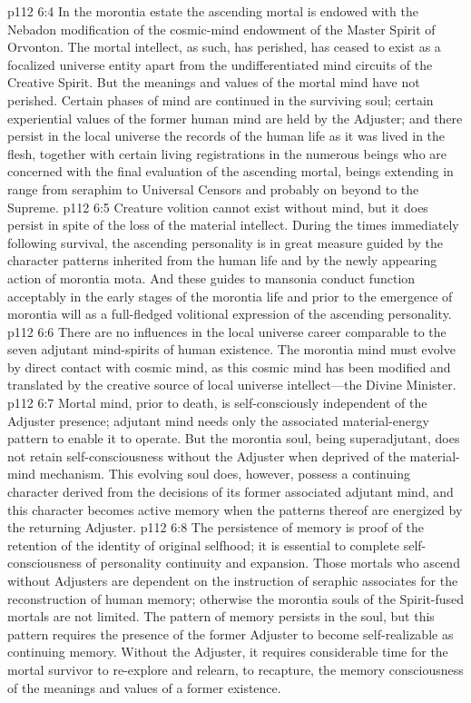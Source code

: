 \pc \vs p112 6:4 In the morontia estate the ascending mortal is endowed with the Nebadon modification of the cosmic\hyp{}mind endowment of the Master Spirit of Orvonton. The mortal intellect, as such, has perished, has ceased to exist as a focalized universe entity apart from the undifferentiated mind circuits of the Creative Spirit. But the meanings and values of the mortal mind have not perished. Certain phases of mind are continued in the surviving soul; certain experiential values of the former human mind are held by the Adjuster; and there persist in the local universe the records of the human life as it was lived in the flesh, together with certain living registrations in the numerous beings who are concerned with the final evaluation of the ascending mortal, beings extending in range from seraphim to Universal Censors and probably on beyond to the Supreme.
\vs p112 6:5 Creature volition cannot exist without mind, but it does persist in spite of the loss of the material intellect. During the times immediately following survival, the ascending personality is in great measure guided by the character patterns inherited from the human life and by the newly appearing action of morontia mota. And these guides to mansonia conduct function acceptably in the early stages of the morontia life and prior to the emergence of morontia will as a full\hyp{}fledged volitional expression of the ascending personality.
\vs p112 6:6 There are no influences in the local universe career comparable to the seven adjutant mind\hyp{}spirits of human existence. The morontia mind must evolve by direct contact with cosmic mind, as this cosmic mind has been modified and translated by the creative source of local universe intellect---the Divine Minister.
\pc \vs p112 6:7 Mortal mind, prior to death, is self\hyp{}consciously independent of the Adjuster presence; adjutant mind needs only the associated material\hyp{}energy pattern to enable it to operate. But the morontia soul, being superadjutant, does not retain self\hyp{}consciousness without the Adjuster when deprived of the material\hyp{}mind mechanism. This evolving soul does, however, possess a continuing character derived from the decisions of its former associated adjutant mind, and this character becomes active memory when the patterns thereof are energized by the returning Adjuster.
\vs p112 6:8 The persistence of memory is proof of the retention of the identity of original selfhood; it is essential to complete self\hyp{}consciousness of personality continuity and expansion. Those mortals who ascend without Adjusters are dependent on the instruction of seraphic associates for the reconstruction of human memory; otherwise the morontia souls of the Spirit\hyp{}fused mortals are not limited. The pattern of memory persists in the soul, but this pattern requires the presence of the former Adjuster to become  self\hyp{}realizable as continuing memory. Without the Adjuster, it requires considerable time for the mortal survivor to re\hyp{}explore and relearn, to recapture, the memory consciousness of the meanings and values of a former existence.\plusone
